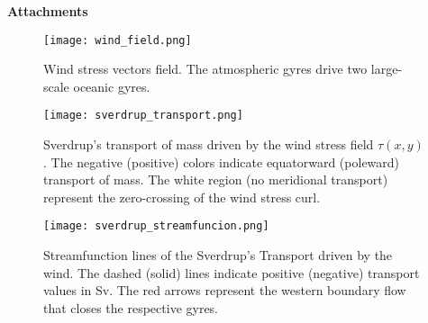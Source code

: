 \documentclass[12pt,a4paper]{article}
\begin{document}
\pagestyle{empty}

\begin{center}
\Huge \textbf{Attachments}
\end{center}

\vspace*{-0.5cm}

\begin{figure}[h]
\begin{center}
\texttt{[image: wind\_field.png]}\\
\end{center}\caption{Wind stress vectors field. The atmospheric gyres drive two large-scale oceanic gyres.}
\end{figure}

\begin{figure}[!h]
\begin{center}
\texttt{[image: sverdrup\_transport.png]}\\
\end{center}\caption{Sverdrup's transport of mass driven by the wind stress field $\tau (x,y)$. The negative (positive) colors indicate equatorward (poleward) transport of mass. The white region (no meridional transport) represent the zero-crossing of the wind stress curl.}
\end{figure}
\vfill


\clearpage
\newpage

\begin{figure}[p]
\begin{center}

\texttt{[image: sverdrup\_streamfuncion.png]}\\
\end{center}\caption{Streamfunction lines of the Sverdrup's Transport driven by the wind. The dashed (solid) lines indicate positive (negative) transport values in Sv. The red arrows represent the western boundary flow that closes the respective gyres.}
\end{figure}
\end{document}
